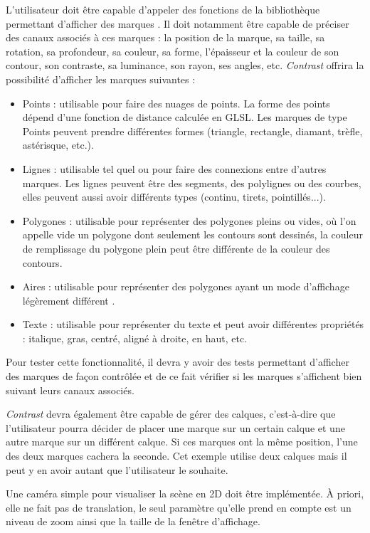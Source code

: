 \documentclass[12pt]{article}
\begin{document}
L'utilisateur doit être capable d'appeler des fonctions de la bibliothèque permettant d'afficher des
\gls{marque}s \cite{VegaMarks}. Il doit notamment être capable de préciser des \gls{canaux} associés à
ces marques : la position de la marque, sa taille, sa rotation, sa profondeur, sa couleur, sa forme,
l'épaisseur et la couleur de son contour, son contraste, sa luminance, son rayon, ses angles, etc.
\textit{Contrast} offrira la possibilité d'afficher les marques suivantes :
\begin{itemize}
    \item Points : utilisable pour faire des nuages de points. La forme des points dépend d'une fonction de
    distance calculée en GLSL. Les marques de type Points peuvent prendre différentes formes (triangle, rectangle, diamant, trèfle, astérisque, etc.).
    \item Lignes : utilisable tel quel ou pour faire des connexions entre d'autres marques. Les lignes
    peuvent être des segments, des polylignes ou des courbes, elles peuvent aussi avoir différents types
    (continu, tirets, pointillés...).
    \item Polygones : utilisable pour représenter des polygones pleins ou vides, où l'on appelle vide un
    polygone dont seulement les contours sont dessinés, la couleur de remplissage du polygone plein peut être
    différente de la couleur des contours.
    \item Aires : utilisable pour représenter des polygones ayant un mode d'affichage légèrement différent
    \cite{VegaMarks}.
    \item Texte : utilisable pour représenter du texte et peut avoir différentes propriétés : italique,
    gras, centré, aligné à droite, en haut, etc.
\end{itemize}

Pour tester cette fonctionnalité, il devra y avoir des tests permettant d'afficher des marques de façon
contrôlée et de ce fait vérifier si les marques s'affichent bien suivant leurs \gls{canaux} associés.

\textit{Contrast} devra également être capable de gérer des calques, c'est-à-dire que l'utilisateur pourra
décider de placer une marque sur un certain calque et une autre marque sur un différent calque. Si ces
marques ont la même position, l'une des deux marques cachera la seconde. Cet exemple utilise deux calques
mais il peut y en avoir autant que l'utilisateur le souhaite.

Une caméra simple pour visualiser la scène en 2D doit être implémentée. À priori, elle ne fait pas
de translation, le seul paramètre qu'elle prend en compte est un niveau de zoom ainsi que la taille
de la fenêtre d'affichage.
\end{document}
